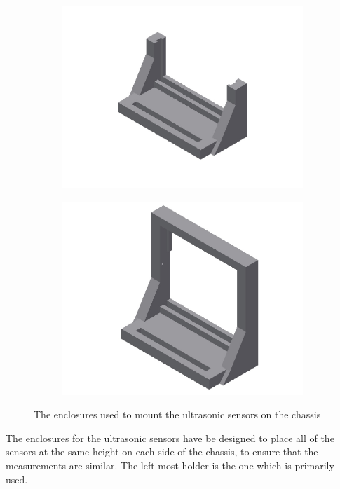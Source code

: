 \begin{figure}[H]
	\centering
	\begin{subfigure}[H]{0.4\textwidth}
		\includegraphics[width=\textwidth]{images/ultrasonicholder.jpg}
	\end{subfigure}%
	\quad
	\begin{subfigure}[H]{0.4\textwidth}
		\includegraphics[width=\textwidth]{images/ultrasonicholder-upsidedown.jpg}
	\end{subfigure}
	\caption{The enclosures used to mount the ultrasonic sensors on the chassis}
\end{figure}

The enclosures for the ultrasonic sensors have be designed to place all of the sensors at the same height on each side of the chassis, to ensure that the measurements are similar. The left-most holder is the one which is primarily used.

